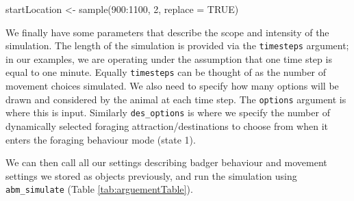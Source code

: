 \documentclass[10pt,a4paper]{article}
\newenvironment{Shaded}{}{}
\newcommand{\AttributeTok}[1]{#1}
\newcommand{\ConstantTok}[1]{#1}
\newcommand{\DecValTok}[1]{#1}
\newcommand{\FunctionTok}[1]{#1}
\newcommand{\NormalTok}[1]{#1}
\newcommand{\OtherTok}[1]{#1}
\newcommand{\SpecialCharTok}[1]{#1}
\begin{document}
\begin{Shaded}
\begin{Highlighting}[]
\NormalTok{startLocation }\OtherTok{\textless{}{-}} \FunctionTok{sample}\NormalTok{(}\DecValTok{900}\SpecialCharTok{:}\DecValTok{1100}\NormalTok{, }\DecValTok{2}\NormalTok{, }\AttributeTok{replace =} \ConstantTok{TRUE}\NormalTok{)}
\end{Highlighting}
\end{Shaded}

We finally have some parameters that describe the scope and intensity of the simulation.
The length of the simulation is provided via the \texttt{timesteps} argument; in our examples, we are operating under the assumption that one time step is equal to one minute.
Equally \texttt{timesteps} can be thought of as the number of movement choices simulated.
We also need to specify how many options will be drawn and considered by the animal at each time step.
The \texttt{options} argument is where this is input.
Similarly \texttt{des\_options} is where we specify the number of dynamically selected foraging attraction/destinations to choose from when it enters the foraging behaviour mode (state 1).

We can then call all our settings describing badger behaviour and movement settings we stored as objects previously, and run the simulation using \texttt{abm\_simulate} (Table \ref{tab:arguementTable}).
\end{document}
